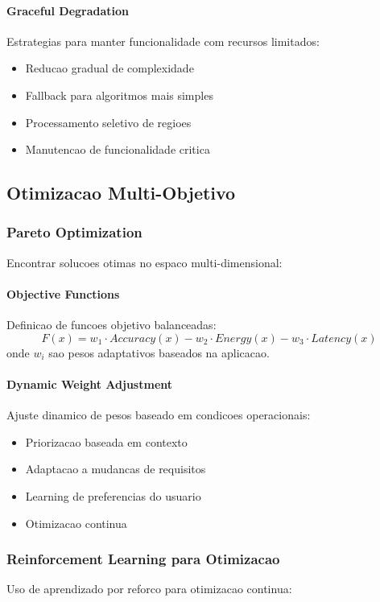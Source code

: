 \paragraph{Graceful Degradation}
Estrategias para manter funcionalidade com recursos limitados:
\begin{itemize}
    \item Reducao gradual de complexidade
    \item Fallback para algoritmos mais simples
    \item Processamento seletivo de regioes
    \item Manutencao de funcionalidade critica
\end{itemize}

\subsection{Otimizacao Multi-Objetivo}

\subsubsection{Pareto Optimization}
Encontrar solucoes otimas no espaco multi-dimensional:

\paragraph{Objective Functions}
Definicao de funcoes objetivo balanceadas:
\begin{equation}
F(x) = w_1 \cdot Accuracy(x) - w_2 \cdot Energy(x) - w_3 \cdot Latency(x)
\end{equation}
onde $w_i$ sao pesos adaptativos baseados na aplicacao.

\paragraph{Dynamic Weight Adjustment}
Ajuste dinamico de pesos baseado em condicoes operacionais:
\begin{itemize}
    \item Priorizacao baseada em contexto
    \item Adaptacao a mudancas de requisitos
    \item Learning de preferencias do usuario
    \item Otimizacao continua
\end{itemize}

\subsubsection{Reinforcement Learning para Otimizacao}
Uso de aprendizado por reforco para otimizacao continua:


